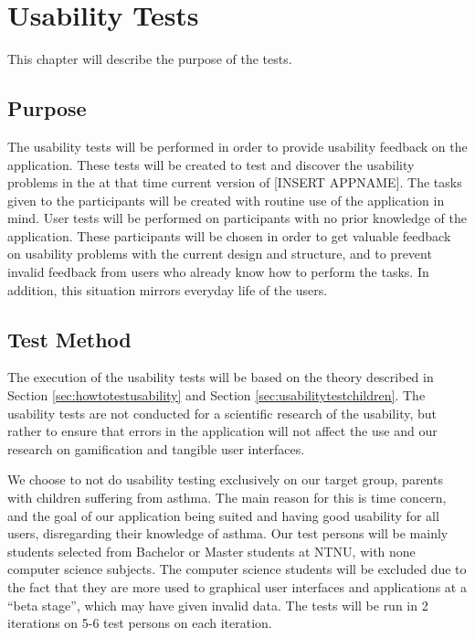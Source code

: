 \chapter{Usability Tests}
\label{chp:usabilitytests}

This chapter will describe the purpose of the tests.


\section{Purpose}
\label{sec:usabilitypurpose}
The usability tests will be performed in order to provide usability feedback on the application. These tests will be created to test and discover the usability problems in the at that time current version of [INSERT APPNAME]. The tasks given to the participants will be created with routine use of the application in mind. User tests will be performed on participants with no prior knowledge of the application. These participants will be chosen in order to get valuable feedback on usability problems with the current design and structure, and to prevent invalid feedback from users who already know how to perform the tasks. In addition, this situation mirrors everyday life of the users.


\section{Test Method}
The execution of the usability tests will be based on the theory described in Section \ref{sec:howtotestusability} and Section \ref{sec:usabilitytestchildren}. The usability tests are not conducted for a scientific research of the usability, but rather to ensure that errors in the application will not affect the use and our research on gamification and tangible user interfaces.

We choose to not do usability testing exclusively on our target group, parents with children suffering from asthma. The main reason for this is time concern, and the goal of our application being suited and having good usability for all users, disregarding their knowledge of asthma. Our test persons will be mainly students selected from Bachelor or Master students at NTNU, with none computer science subjects. The computer science students will be excluded due to the fact that they are more used to graphical user interfaces and applications at a ``beta stage'', which may have given invalid data. The tests will be run in 2 iterations on 5-6 test persons on each iteration. 

